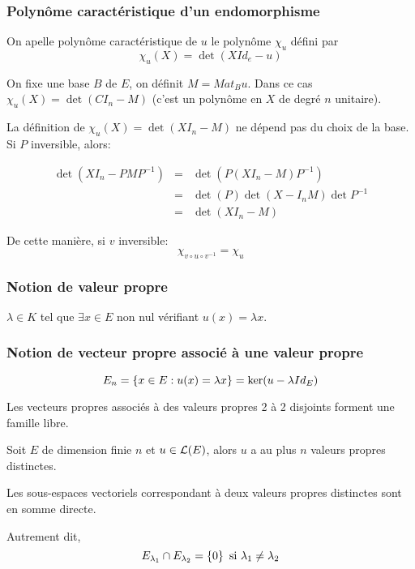\subsubsection{Polynôme caractéristique d'un endomorphisme}

On apelle polynôme caractéristique de $u$ le polynôme  $\chi_u$ défini par
$$\chi_u(X) = \det (X Id_e - u)$$

On fixe une base $B$ de $E$, on définit $M = Mat_B u$.
Dans ce cas $\chi_u(X) = \det (CI_n -M)$
(c'est un polynôme en $X$ de degré $n$ unitaire).

La définition de $\chi_u(X) = \det (XI_n-M)$ ne dépend pas du choix de la base.
Si $P$ inversible, alors:


\begin{eqnarray*}
	\det (XI_n - PMP^{-1}) &=& \det (P(XI_n -M) P^{-1})\\
	&=& \det (P) \det (X-I_nM)\det P^{-1}\\
	&=& \det (XI_n -M)
\end{eqnarray*}



De cette manière, si $v$ inversible:
$$ \chi_{v\circ u \circ v^{-1}} = \chi_{u}$$


\subsubsection{Notion de valeur propre}

$\lambda \in K$ tel que $\exists x \in E$ non nul vérifiant $u(x) = \lambda x$.

\subsubsection{Notion de vecteur propre associé à une valeur propre}

$$E_n = \left\{ x \in E: u (x) = \lambda x \right\} = \ker (u - \lambda Id_E) $$

\begin{prop}
	Les vecteurs propres associés à des valeurs propres 2 à 2 disjoints forment une famille libre.
\end{prop}

\begin{coro}
	Soit $E$ de dimension finie $n$ et $u \in \mathcal{L}(E)$, alors $u$ a au plus $n$ valeurs propres distinctes.
\end{coro}


\begin{prop}
	Les sous-espaces vectoriels correspondant à deux valeurs propres distinctes sont en somme directe.

	Autrement dit,
	$$E_{\lambda_1} \cap E_{\lambda_2} = \left\{0\right\} \text { si } \lambda_1 \neq \lambda_2$$
\end{prop}

